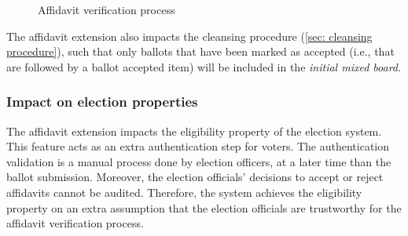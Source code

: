 \begin{figure}[ht]
    \caption{Affidavit verification process}
    \label{fig: affidavit verification process}
\end{figure}

The affidavit extension also impacts the cleansing procedure (\cref{sec: cleansing procedure}), such that only ballots that have been marked as accepted (i.e., that are followed by a ballot accepted item) will be included in the \textit{initial mixed board}.


\subsubsection{Impact on election properties}
The affidavit extension impacts the eligibility property of the election system. This feature acts as an extra authentication step for voters. The authentication validation is a manual process done by election officers, at a later time than the ballot submission. Moreover, the election officials' decisions to accept or reject affidavits cannot be audited. Therefore, the system achieves the eligibility property on an extra assumption that the election officials are trustworthy for the affidavit verification process.
